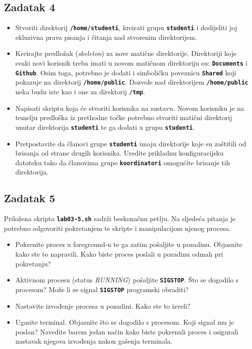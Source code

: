 \documentclass[12pt,a4paper]{article}
\newcommand{\shell}[1]{\texttt{\textbf{#1}}}
\begin{document}
	\subsection*{Zadatak 4}
	\begin{itemize}
    \item Stvoriti direktorij \shell{/home/studenti}, kreirati grupu \shell{studenti} i dodijeliti joj ekluzivna prava pisanja i čitanja nad stvorenim direktorijem.
    \item Kreirajte predložak (\emph{skeleton}) za nove matične direktorije. Direktoriji koje svaki novi korisnik treba imati u novom matičnom direktoriju su: \shell{Documents} i \shell{Github}. Osim toga, potrebno je dodati i simboličku poveznicu \shell{Shared} koji pokazuje na direktorij \shell{/home/public}. Dozvole nad direktorijem \shell{/home/public} neka budu iste kao i one za direktorij \shell{/tmp}.
    \item Napisati skriptu koja će stvoriti korisnika na sustavu. Novom korisniku je na temelju predloška iz prethodne točke potrebno stvoriti matični direktorij unutar direktorija \shell{studenti} te ga dodati u grupu \shell{studenti}.
    \item Pretpostavite da članovi grupe \shell{studenti} imaju direktorije koje su zaštitili od brisanja od strane drugih korisnika. Uredite prikladnu konfiguracijsku datoteku tako da članovima grupe \shell{koordinatori} omogućite brisanje tih direktorija.
	\end{itemize}
  
	\subsection*{Zadatak 5}
  Priložena skripta \shell{lab03-5.sh} sadrži beskonačnu petlju. Na sljedeća pitanja je potrebno odgovoriti pokretanjem te skripte i manipulacijom njenog procesa.
	\begin{itemize}
    \item Pokrenite proces u foreground-u te ga zatim pošaljite u pozadinu. Objasnite kako ste to napravili. Kako biste proces poslali u pozadinu odmah pri pokretanju?
    \item Aktivnom procesu (status \emph{RUNNING}) pošaljite \shell{SIGSTOP}. Što se dogodilo s procesom? Može li se signal \shell{SIGSTOP} programski obraditi?
    \item Nastavite izvođenje procesa u pozadini. Kako ste to izveli?
    \item Ugasite terminal. Objasnite što se dogodilo s procesom. Koji signal mu je poslan? Navedite barem jedan način kako biste pokrenuli proces i osigurali nastavak njegova izvođenja nakon gašenja terminala.
	\end{itemize}
\end{document}

